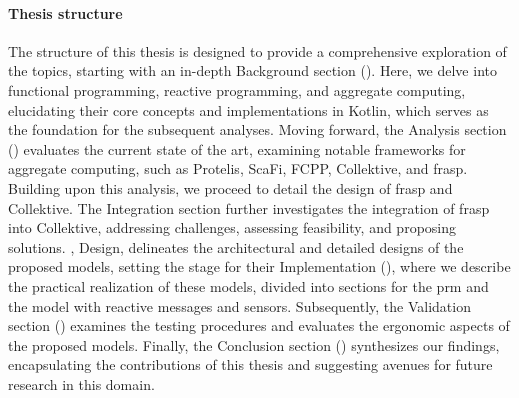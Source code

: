 \paragraph{Thesis structure}

The structure of this thesis is designed to provide a comprehensive exploration of the topics, starting with an in-depth Background section (). Here, we delve into functional programming, reactive programming, and aggregate computing, elucidating their core concepts and implementations in Kotlin, which serves as the foundation for the subsequent analyses. Moving forward, the Analysis section () evaluates the current state of the art, examining notable frameworks for aggregate computing, such as Protelis, ScaFi, FCPP, Collektive, and \ac{frasp}. Building upon this analysis, we proceed to detail the design of \ac{frasp} and Collektive. The Integration section further investigates the integration of \ac{frasp} into Collektive, addressing challenges, assessing feasibility, and proposing solutions. , Design, delineates the architectural and detailed designs of the proposed models, setting the stage for their Implementation (), where we describe the practical realization of these models, divided into sections for the \ac{prm} and the model with reactive messages and sensors. Subsequently, the Validation section () examines the testing procedures and evaluates the ergonomic aspects of the proposed models. Finally, the Conclusion section () synthesizes our findings, encapsulating the contributions of this thesis and suggesting avenues for future research in this domain.
